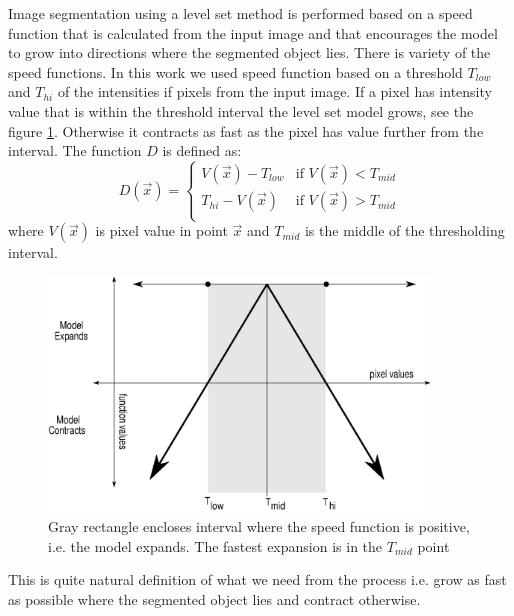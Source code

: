 Image segmentation using a level set method is performed based on a speed function that is calculated from the input image and that encourages the model to grow into directions where the segmented object lies.
There is variety of the speed functions.
In this work we used speed function based on a threshold $T_{low}$ and $T_{hi}$ of the intensities if pixels from the input image.
If a pixel has intensity value that is within the threshold interval the level set model grows, see the figure \ref{fg:speedFunction}.
Otherwise it contracts as fast as the pixel has value further from the interval.
The function $D$ is defined as:
\begin{equation}
\label{eq:speedFunction}
D(\vec{x}) =
\begin{cases}
V(\vec{x}) - T_{low} & \text{if $V(\vec{x}) < T_{mid}$}\\
T_{hi} - V(\vec{x}) & \text{if $V(\vec{x}) > T_{mid}$}\\
\end{cases}
\end{equation}
where $V(\vec{x})$ is pixel value in point $\vec{x}$ and $T_{mid}$ is the middle of the thresholding interval.

\begin{figure}
    \centering
    \includegraphics[width=0.9\textwidth]{data/speedFunction}
    \caption[Graph of thresholding based speed function]
    {
      Gray rectangle encloses interval where the speed function is positive, i.e. the model expands.
      The fastest expansion is in the $T_{mid}$ point
    }
    \label{fg:speedFunction}
\end{figure}

\par
This is quite natural definition of what we need from the process i.e. grow as fast as possible where the segmented object lies and contract otherwise.

